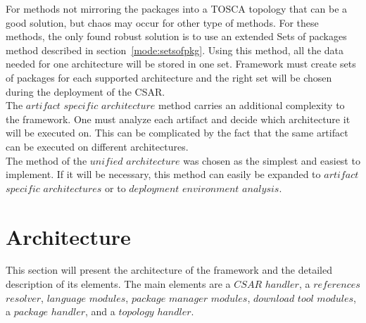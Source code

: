 For methods not mirroring the packages into a TOSCA topology that can be a good solution, but chaos may occur for other type of methods.
For these methods, the only found robust solution is to use an extended Sets of packages method described in section~\ref{mode:setsofpkg}. 
Using this method, all the data needed for one architecture will be stored in one set.
Framework must create sets of packages for each supported architecture and the right set will be chosen during the deployment of the CSAR.
\\
The $artifact$ $specific$ $architecture$ method carries an additional complexity to the framework.
One must analyze each artifact and decide which architecture it will be executed on. 
This can be complicated by the fact that the same artifact can be executed on different architectures.\\
The method of the $unified$ $architecture$ was chosen as the simplest and easiest to implement.
If it will be necessary, this method can easily be expanded to $artifact$ $specific$ $architectures$ or to $deployment$ $environment$ $analysis$.

%



\section{Architecture}\label{sec:arch}
This section will present the architecture of the framework and the detailed description of its elements.
The main elements are a \boldmath $CSAR$ $handler$, a $references$ $resolver$, $language$ $modules$, $package$ $manager$ $modules$, $download$ $tool$ $modules$, a $package$ $handler$, and a $topology$ $handler$. \unboldmath


